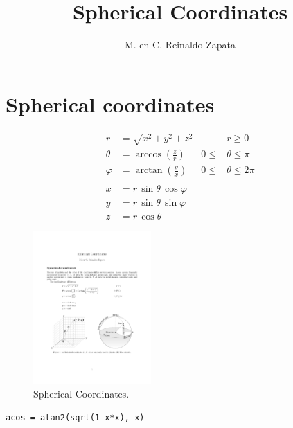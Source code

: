 \documentclass{article}
\title{Spherical Coordinates}
\author{M. en C. Reinaldo Zapata}
\begin{document}
\maketitle

\section*{Spherical coordinates} %
\label{sec:spherical_coordinates}

\begin{align*}
r &= \sqrt{x^{2} + y^{2} + z^{2}} & & r \geq 0\\
\theta &= \arccos \left( \frac{z}{r} \right) & 0 \leq &\theta \leq \pi \\
\varphi &= \arctan \left( \frac{y}{x} \right) & 0 \leq &\theta \leq 2\pi \\ \\ 
x &= r \, \sin \theta \, \cos \varphi \\
y &= r \, \sin \theta \, \sin \varphi \\
z &= r \, \cos \theta
\end{align*}

\begin{figure}[h]
    \centering
    \includegraphics[width=0.4\textwidth]{spherical_coordinates}
    \caption{Spherical Coordinates.}
    \label{fig:spherical coordinates}
\end{figure}

\tt{acos =  atan2(sqrt(1-x*x), x) }


\end{document}
